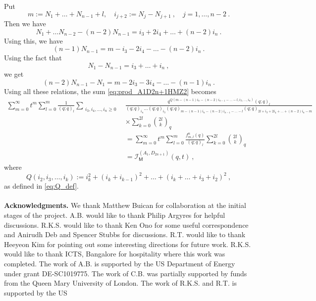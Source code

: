 \documentclass[a4paper,10pt]{article}
\newcommand{\mr}[1]{\mathsf{#1}}
\begin{document}
Put 
\begin{equation}
    m:=N_1+\dots+N_{n-1}+l,\quad i_{j+2}:=N_{j}-N_{j+1}~,\quad j=1,\dots,n-2~.
\end{equation}
Then we have 
\begin{equation}
    N_1+\dots N_{n-2}-(n-2)N_{n-1}=i_3+2i_4+\dots+(n-2)i_{n}~.
\end{equation}
Using this, we have 
\begin{equation}
    (n-1)N_{n-1}=m-i_3-2i_4-\dots-(n-2)i_{n}~.
\end{equation}
Using the fact that 
\begin{equation}
    N_1-N_{n-1}=i_3+\dots+i_n~,
\end{equation}
we get 
\begin{equation}
    (n-2)N_{n-1}-N_1=m-2i_3-3i_4-\dots-(n-1)i_n~.
\end{equation}
Using all these relations, the sum \eqref{eq:prod_A1D2n+1HMZ2} becomes 
\begin{equation}
\begin{split}
\sum_{m=0}^\infty t^m\sum_{l=0}^m\frac{1}{(q;q)_l}\sum_{\substack{i_3, i_4,\dots,i_n\geq 0}}&\frac{q^{Q(m-(n-1)i_n-(n-2)i_{n-1}-\dots-l,i_3,\dots,i_n)}(q;q)_{l}}{(q;q)_{i_n}\dots (q;q)_{i_3}(q;q)_{m-(n-1)i_n-(n-2)i_{n-1}-\dots-l}(q;q)_{2l+i_3+2i_4+\dots+(n-2)i_n-m}}\\&\times\sum_{k=0}^{2l}{2l\choose k}_q
\\&=\sum_{m=0}^\infty t^m\sum_{l=0}^m\frac{f^n_{m,l}(q)}{(q;q)_l}\sum_{k=0}^{2l}{2l\choose k}_q
\\&=\mathcal{I}^{(A_1,D_{2n+1})}_{\mr{M}}(q,t)~,
\end{split}
\end{equation}
where 
\begin{equation}
    Q(i_2,i_3,\dots,i_k):=i_k^2+(i_k+i_{k-1})^2+\dots+(i_k+\dots+i_3+i_2)^2~,
\end{equation}
as defined in \eqref{eq:Q_def}.
\\\\
\textbf{Acknowledgments.} We thank Matthew Buican for collaboration at the initial stages of the project. A.B. would like to thank Philip Argyres for helpful discussions. R.K.S. would like to thank Ken Ono for some useful correspondence and Anirudh Deb and Spencer Stubbs for discussions. R.T. would like to thank Heeyeon Kim for pointing out some interesting directions for future work. R.K.S. would like to thank ICTS, Bangalore for hospitality where this work was completed. The work of A.B. is supported by the US Department of Energy under grant DE-SC1019775. The work of C.B. was partially supported by funds from the Queen Mary University of London. The work of R.K.S. and R.T. is supported by the US
\end{document}
